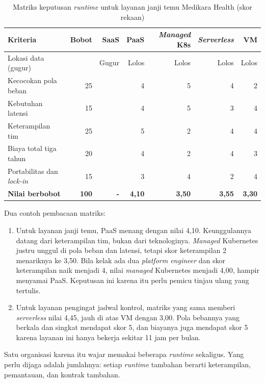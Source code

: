 \begin{table}[!htb]
  \centering
  \caption{Matriks keputusan \textit{runtime} untuk layanan janji temu Medikara Health (skor
           rekaan)}
  \label{tab:ch08-matriks-janji-temu}
  \footnotesize
  \begin{tabularx}{\textwidth}{>{\raggedright\arraybackslash}X r r r r r r}
    \hline
    \textbf{Kriteria} & \textbf{Bobot} & \textbf{SaaS} & \textbf{PaaS} &
      \textbf{\textit{Managed} K8s} & \textbf{\textit{Serverless}} & \textbf{VM} \\ \hline
    Lokasi data (gugur) & & Gugur & Lolos & Lolos & Lolos & Lolos \\ \hline
    Kecocokan pola beban & 25 & & 4 & 5 & 4 & 2 \\ \hline
    Kebutuhan latensi & 15 & & 4 & 5 & 3 & 4 \\ \hline
    Keterampilan tim & 25 & & 5 & 2 & 4 & 4 \\ \hline
    Biaya total tiga tahun & 20 & & 4 & 2 & 4 & 3 \\ \hline
    Portabilitas dan \textit{lock-in} & 15 & & 3 & 4 & 2 & 4 \\ \hline
    \textbf{Nilai berbobot} & \textbf{100} & \textbf{-} & \textbf{4,10} & \textbf{3,50} &
      \textbf{3,55} & \textbf{3,30} \\ \hline
  \end{tabularx}
\end{table}

Dua contoh pembacaan matriks:
\begin{enumerate}
  \item Untuk layanan janji temu, PaaS menang dengan nilai 4,10. Keunggulannya datang dari
        keterampilan tim, bukan dari teknologinya. \textit{Managed} Kubernetes justru unggul di
        pola beban dan latensi, tetapi skor keterampilan 2 menariknya ke 3,50. Bila kelak ada dua
        \textit{platform engineer} dan skor keterampilan naik menjadi 4, nilai \textit{managed}
        Kubernetes menjadi 4,00, hampir menyamai PaaS. Keputusan ini karena itu perlu pemicu
        tinjau ulang yang tertulis.
  \item Untuk layanan pengingat jadwal kontrol, matriks yang sama memberi \textit{serverless} nilai
        4,45, jauh di atas VM dengan 3,00. Pola bebannya yang berkala dan singkat mendapat skor 5,
        dan biayanya juga mendapat skor 5 karena layanan ini hanya bekerja sekitar 11 jam per
        bulan.
\end{enumerate}

Satu organisasi karena itu wajar memakai beberapa \textit{runtime} sekaligus. Yang perlu dijaga
adalah jumlahnya: setiap \textit{runtime} tambahan berarti keterampilan, pemantauan, dan kontrak
tambahan.

